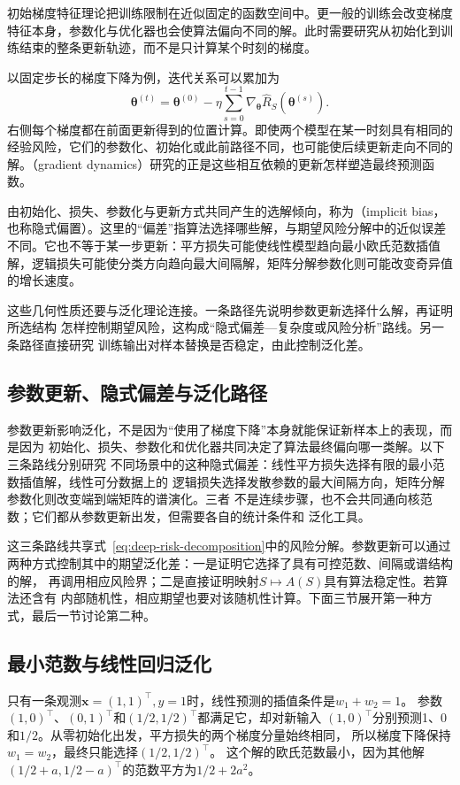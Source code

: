 初始梯度特征理论把训练限制在近似固定的函数空间中。更一般的训练会改变梯度特征本身，参数化与优化器也会使算法偏向不同的解。此时需要研究从初始化到训练结束的整条更新轨迹，而不是只计算某个时刻的梯度。

以固定步长的梯度下降为例，迭代关系可以累加为
\[
 \bm\theta^{(t)}=\bm\theta^{(0)}
 -\eta\sum_{s=0}^{t-1}\nabla_{\bm\theta}\hat R_S(\bm\theta^{(s)}).
\]
右侧每个梯度都在前面更新得到的位置计算。即使两个模型在某一时刻具有相同的经验风险，它们的参数化、初始化或此前路径不同，也可能使后续更新走向不同的解。（gradient dynamics）研究的正是这些相互依赖的更新怎样塑造最终预测函数。

由初始化、损失、参数化与更新方式共同产生的选解倾向，称为（implicit bias，也称隐式偏置）。这里的“偏差”指算法选择哪些解，与期望风险分解中的近似误差不同。它也不等于某一步更新：平方损失可能使线性模型趋向最小欧氏范数插值解，逻辑损失可能使分类方向趋向最大间隔解，矩阵分解参数化则可能改变奇异值的增长速度。

这些几何性质还要与泛化理论连接。一条路径先说明参数更新选择什么解，再证明所选结构
怎样控制期望风险，这构成“隐式偏差—复杂度或风险分析”路线。另一条路径直接研究
训练输出对样本替换是否稳定，由此控制泛化差。

\subsection{参数更新、隐式偏差与泛化路径}

参数更新影响泛化，不是因为“使用了梯度下降”本身就能保证新样本上的表现，而是因为
初始化、损失、参数化和优化器共同决定了算法最终偏向哪一类解。以下三条路线分别研究
不同场景中的这种隐式偏差：线性平方损失选择有限的最小范数插值解，线性可分数据上的
逻辑损失选择发散参数的最大间隔方向，矩阵分解参数化则改变端到端矩阵的谱演化。三者
不是连续步骤，也不会共同通向核范数；它们都从参数更新出发，但需要各自的统计条件和
泛化工具。

这三条路线共享式~\eqref{eq:deep-risk-decomposition}中的风险分解。参数更新可以通过
两种方式控制其中的期望泛化差：一是证明它选择了具有可控范数、间隔或谱结构的解，
再调用相应风险界；二是直接证明映射$S\mapsto A(S)$具有算法稳定性。若算法还含有
内部随机性，相应期望也要对该随机性计算。下面三节展开第一种方式，最后一节讨论第二种。

\subsection{最小范数与线性回归泛化}

只有一条观测$\bm x=(1,1)^\top,y=1$时，线性预测的插值条件是$w_1+w_2=1$。
参数$(1,0)^\top$、$(0,1)^\top$和$(1/2,1/2)^\top$都满足它，却对新输入
$(1,0)^\top$分别预测1、0和$1/2$。从零初始化出发，平方损失的两个梯度分量始终相同，
所以梯度下降保持$w_1=w_2$，最终只能选择$(1/2,1/2)^\top$。
这个解的欧氏范数最小，因为其他解$(1/2+a,1/2-a)^\top$的范数平方为$1/2+2a^2$。

